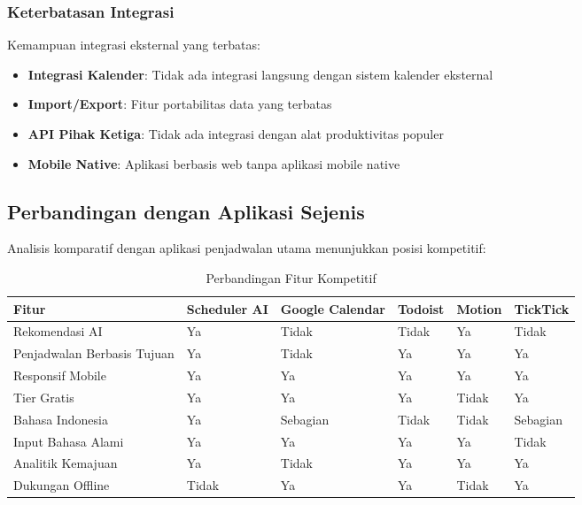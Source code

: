 \subsubsection{Keterbatasan Integrasi}

Kemampuan integrasi eksternal yang terbatas:

\begin{itemize}
\item \textbf{Integrasi Kalender}: Tidak ada integrasi langsung dengan sistem kalender eksternal
\item \textbf{Import/Export}: Fitur portabilitas data yang terbatas
\item \textbf{API Pihak Ketiga}: Tidak ada integrasi dengan alat produktivitas populer
\item \textbf{Mobile Native}: Aplikasi berbasis web tanpa aplikasi mobile native
\end{itemize}

\subsection{Perbandingan dengan Aplikasi Sejenis}

Analisis komparatif dengan aplikasi penjadwalan utama menunjukkan posisi kompetitif:

\begin{table}[ht]
\centering
\caption{Perbandingan Fitur Kompetitif}
\label{tab:competitive-comparison}
\footnotesize
\begin{adjustbox}{width=\textwidth,center}
\begin{tabular}{@{}p{3cm}p{2cm}p{2cm}p{2cm}p{2cm}p{2cm}@{}}
\toprule
\textbf{Fitur} & \textbf{Scheduler AI} & \textbf{Google Calendar} & \textbf{Todoist} & \textbf{Motion} & \textbf{TickTick} \\
\midrule
Rekomendasi AI & Ya & Tidak & Tidak & Ya & Tidak \\
\hline
Penjadwalan Berbasis Tujuan & Ya & Tidak & Ya & Ya & Ya \\
\hline
Responsif Mobile & Ya & Ya & Ya & Ya & Ya \\
\hline
Tier Gratis & Ya & Ya & Ya & Tidak & Ya \\
\hline
Bahasa Indonesia & Ya & Sebagian & Tidak & Tidak & Sebagian \\
\hline
Input Bahasa Alami & Ya & Ya & Ya & Ya & Tidak \\
\hline
Analitik Kemajuan & Ya & Tidak & Ya & Ya & Ya \\
\hline
Dukungan Offline & Tidak & Ya & Ya & Tidak & Ya \\
\bottomrule
\end{tabular}
\end{adjustbox}
\end{table}

